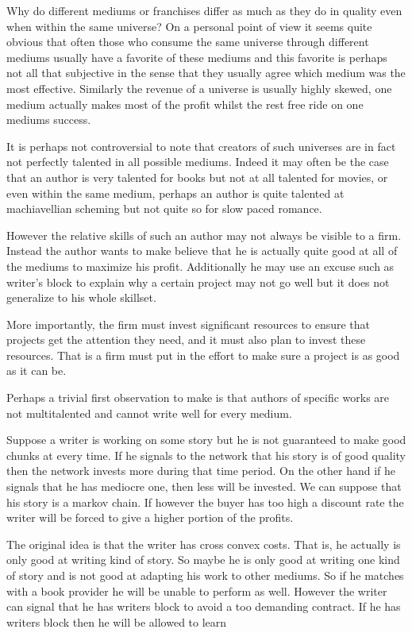 \documentclass{article}
\begin{document}
Why do different mediums or franchises differ as much as they do in quality even when within the same universe? On a personal point of view it seems quite obvious that often those who consume the same universe through different mediums usually have a favorite of these mediums and this favorite is perhaps not all that subjective in the sense that they usually agree which medium was the most effective. Similarly the revenue of a universe is usually highly skewed, one medium actually makes most of the profit whilst the rest free ride on one mediums success. 

It is perhaps not controversial to note that creators of such universes are in fact not perfectly talented in all possible mediums. Indeed it may often be the case that an author is very talented for books but not at all talented for movies, or even within the same medium, perhaps an author is quite talented at machiavellian scheming but not quite so for slow paced romance. 

However the relative skills of such an author may not always be visible to a firm. Instead the author wants to make believe that he is actually quite good at all of the mediums to maximize his profit. Additionally he may use an excuse such as writer's block to explain why a certain project may not go well but it does not generalize to his whole skillset. 

More importantly, the firm must invest significant resources to ensure that projects get the attention they need, and it must also plan to invest these resources. That is a firm must put in the effort to make sure a project is as good as it can be. 

Perhaps a trivial first observation to make is that authors of specific works are not multitalented and cannot write well for every medium. 

Suppose a writer is working on some story but he is not guaranteed to make good chunks at every time. If he signals to the network that his story is of good quality then the network invests more during that time period. On the other hand if he signals that he has mediocre one, then less will be invested. We can suppose that his story is a markov chain. If however the buyer has too high a discount rate the writer will be forced to give a higher portion of the profits. 

The original idea is that the writer has cross convex costs. That is, he actually is only good at writing kind of story. So maybe he is only good at writing one kind of story and is not good at adapting his work to other mediums. So if he matches with a book provider he will be unable to perform as well. However the writer can signal that he has writers block to avoid a too demanding contract. If he has writers block then he will be allowed to learn 
\end{document}
